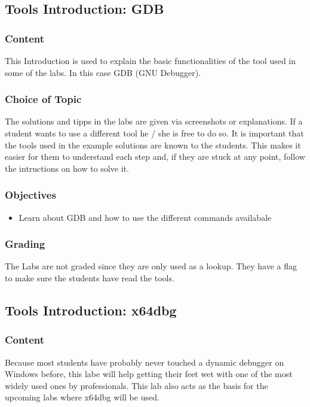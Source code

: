 \subsection{Tools Introduction: GDB}
\subsubsection*{Content}
This Introduction is used to explain the basic functionalities of the tool used in some of the labs. In this case GDB (GNU Debugger).
\subsubsection*{Choice of Topic}
The solutions and tipps in the labs are given via screenshots or explanations. If a student wants to use a different tool he / she is free to do so. It is important that the tools used in the example solutions are known to the students. This makes it easier for them to understand each step and, if they are stuck at any point, follow the intructions on how to solve it. 
\subsubsection*{Objectives}
\begin{itemize}
    \item Learn about GDB and how to use the different commands availabale
\end{itemize}
\subsubsection*{Grading}
The Labs are not graded since they are only used as a lookup. They have a flag to make sure the students have read the tools.


\subsection{Tools Introduction: x64dbg}
\subsubsection*{Content}
Because most students have probably never touched a dynamic debugger on Windows before, this labe will help getting their feet wet with one of the most widely used ones by professionals.
This lab also acts as the basis for the upcoming labs where x64dbg will be used.
